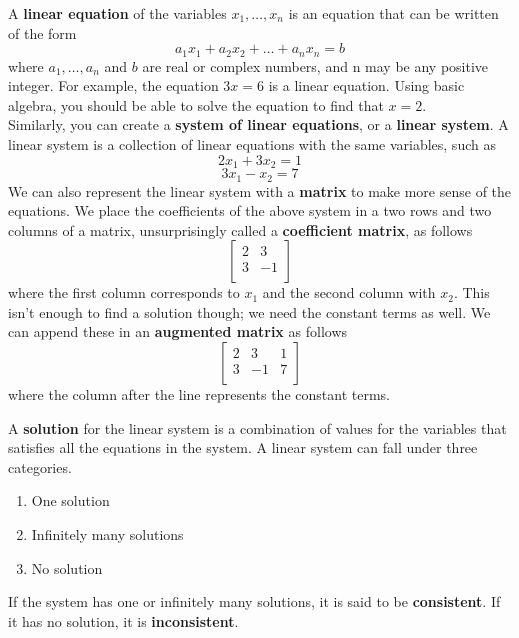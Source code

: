 \documentclass[11pt,fleqn]{article}
\begin{document}
\begin{center}
\begin{tcolorbox}[title={\fontsize{13pt}{13pt}\selectfont Introduction to Linear Systems}, enforce breakable, pad at break=4mm, colframe=darkcrimson!100,colback=black!1,width=.9\linewidth,sharp corners=north]\fontsize{11.5pt}{12pt}\selectfont 
A \textbf{linear equation} of the variables $x_1, \hdots, x_n$ is an equation that can be written of the form 
$$
a_1 x_1 + a_2 x_2 + \hdots + a_n x_n = b
$$
where $a_1, \hdots, a_n$ and $b$ are real or complex numbers, and n may be any positive integer. For example, the equation $3x = 6$ is a linear equation. Using basic algebra, you should be able to solve the equation to find that $x=2$. \\
Similarly, you can create a \textbf{system of linear equations}, or a \textbf{linear system}. A linear system is a collection of linear equations with the same variables, such as 
$$
2x_1 + 3x_2 = 1
$$ 
$$
3x_1 - x_2 = 7
$$ 
We can also represent the linear system with a \textbf{matrix} to make more sense of the equations. We place the coefficients of the above system in a two rows and two columns of a matrix, unsurprisingly called a \textbf{coefficient matrix}, as follows 
$$\left[
\begin{array}{cc}
2 & 3 \\
3 & -1 \\
\end{array}
\right]$$
where the first column corresponds to $x_1$ and the second column with $x_2$. This isn't enough to find a solution though; we need the constant terms as well. We can append these in an \textbf{augmented matrix} as follows
$$\left[
\begin{array}{cc|c}
2 & 3 & 1 \\
3 & -1 & 7 \\
\end{array}
\right]$$
where the column after the line represents the constant terms. 
\end{tcolorbox}

\begin{tcolorbox}[title={\fontsize{13pt}{13pt}\selectfont Solving Linear Systems},enforce breakable, pad at break=4mm, colframe=darkcrimson!100,colback=black!1,width=.9\linewidth,sharp corners=north]\fontsize{11.5pt}{12pt}\selectfont
A \textbf{solution} for the linear system is a combination of values for the variables that satisfies all the equations in the system. A linear system can fall under three categories.
\begin{enumerate}
\item One solution
\item Infinitely many solutions
\item No solution
\end{enumerate}
If the system has one or infinitely many solutions, it is said to be \textbf{consistent}. If it has no solution, it is \textbf{inconsistent}.
\blni


\end{tcolorbox}
\end{center}
\end{document}
